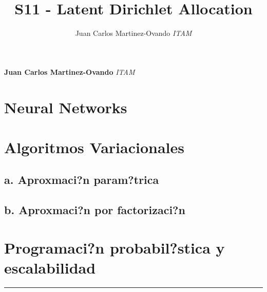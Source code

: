 \documentclass[11pt,]{article}
\title{S11 - Latent Dirichlet Allocation  }
\author{\Large Juan Carlos Martinez-Ovando\vspace{0.05in} \newline\normalsize\emph{ITAM}  }
\date{}
\newcommand*{\authorfont}{\fontfamily{phv}\selectfont}
\begin{document}
	
%

{%
\setlength{\parindent}{0pt}
\thispagestyle{plain}
{\fontsize{18}{20}\selectfont\raggedright 
\maketitle  %

}

{
   \vskip 13.5pt\relax \normalsize\fontsize{11}{12} 
\textbf{\authorfont Juan Carlos Martinez-Ovando} \hskip 15pt \emph{\small ITAM}   

}

}






\vskip 6.5pt


\noindent  \section{\texorpdfstring{\textbf{Neural
Networks}}{Neural Networks}}\label{neural-networks}

\section{Algoritmos Variacionales}\label{algoritmos-variacionales}

\subsection{a. Aproxmaci?n param?trica}\label{a.-aproxmacin-paramtrica}

\subsection{b. Aproxmaci?n por
factorizaci?n}\label{b.-aproxmacin-por-factorizacin}

\section{Programaci?n probabil?stica y
escalabilidad}\label{programacin-probabilstica-y-escalabilidad}

\begin{center}\rule{0.5\linewidth}{\linethickness}\end{center}
\end{document}
